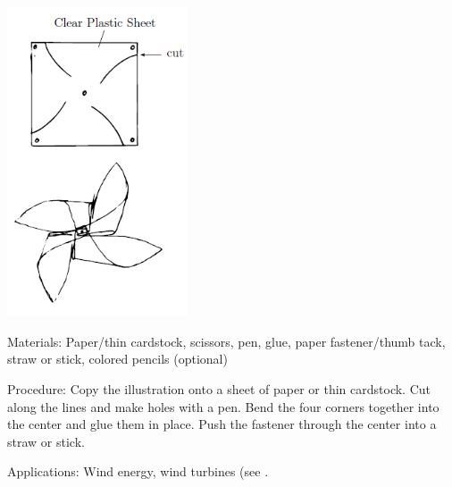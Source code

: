 \begin{multicols}{2}
\begin{center}
\includegraphics[width=0.4\textwidth]{./img/windmill.png}
\end{center}

\begin{description*}
\item[Materials:]{Paper/thin cardstock, scissors, pen, glue, paper fastener/thumb tack, straw or stick, colored pencils (optional)}
\item[Procedure:]{Copy the illustration onto a sheet of paper or thin cardstock. Cut along the lines and make holes with a pen. Bend the four corners together into the center and glue them in place. Push the fastener through the center into a straw or stick.}
\item[Applications:]{Wind energy, wind turbines (see .}
\end{description*}

%
%


\end{multicols}
